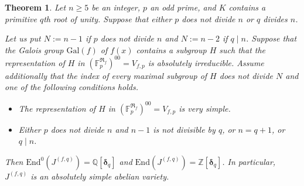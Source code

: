 \documentclass[12pt,a4paper,reqno]{amsart}
\def\Q{{\mathbb Q}}
\def\Z{{\mathbb Z}}
\def\R{{\mathbb R}}
\def\F{{\mathbb F}}
\def\R{{\mathfrak R}}
\def\Gal{\mathrm{Gal}}
\def\End{\mathrm{End}}
\def\delt{{\boldsymbol \delta}}
\newtheorem{thm}{Theorem}[section]
\theoremstyle{definition}
\begin{document}
\begin{thm}
\label{SimpleDTnew}
Let $n \ge 5$ be an integer, $p$ an odd prime, and $K$ contains a primitive $q$th root of unity.  Suppose that %
either $p$ does not divide $n$ or $q$ divides $n$.

 Let us put $N:=n-1$ if $p$ does not divide $n$ and $N:=n-2$ if $q\mid n$.
Suppose that the Galois group $\Gal(f)$ of $f(x)$ contains a subgroup $H$  such that the representation of $H$ in $\left(\F_p^{\R_f}\right)^{00}=V_{f,p}$ is absolutely irreducible. 
Assume additionally that the index of every maximal subgroup of  $H$  does not divide $N$  and one of the following conditions holds.
\begin{itemize}
\item[(i)]
 The representation of $H$ in $\left(\F_p^{\R_f}\right)^{00}=V_{f,p}$ is very simple. 
\item[(ii)]
Either $p$ does not divide $n$ and  $n-1$ is not divisible by $q$, or $n=q+1$, or $q\mid n$.
\end{itemize}

Then $\End^0(J^{(f,q)})=\Q[\delt_q]$ and $\End(J^{(f,q)})=\Z[\delt_q]$.
In particular, $J^{(f,q)}$ is an absolutely simple abelian variety.
\end{thm}
\end{document}
